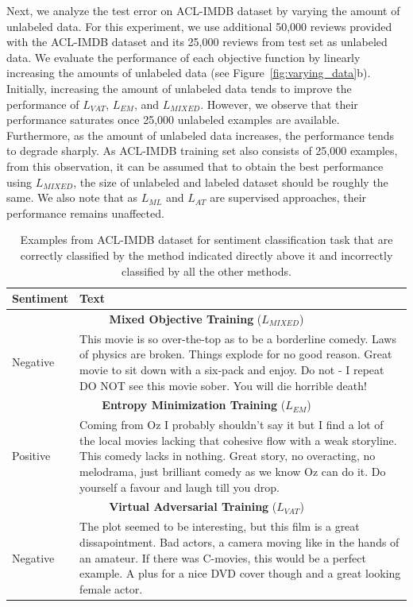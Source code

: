 \documentclass[letterpaper]{article}
\begin{document}
Next, we analyze the test error on ACL-IMDB dataset by varying the amount of unlabeled data. For this experiment, we use additional 50,000 reviews provided with the ACL-IMDB dataset and its 25,000 reviews from test set as unlabeled data. We evaluate the performance of each objective function by linearly increasing the amounts of unlabeled data (see Figure~\ref{fig:varying_data}b). Initially, increasing the amount of unlabeled data tends to improve the performance of $L_{\textit{VAT}}$, $L_{\textit{EM}}$, and $L_{\textit{MIXED}}$. However, we observe that their performance saturates once 25,000 unlabeled examples are available. Furthermore, as the amount of unlabeled data increases, the performance tends to degrade sharply. As ACL-IMDB training set also consists of 25,000 examples, from this observation, it can be assumed that to obtain the best performance using $L_{\textit{MIXED}}$, the size of unlabeled and labeled dataset should be roughly the same. We also note that as $L_{\textit{ML}}$ and $L_{\textit{AT}}$ are supervised approaches, their performance remains unaffected.

\begin{table}[t]
\begin{minipage}{\linewidth}
\small
\centering
\begin{tabularx}{\linewidth}{@{} l X @{}}
\toprule
\textbf{Sentiment} & \textbf{Text} \\
\midrule
\multicolumn{2}{c}{\textbf{Mixed Objective Training} ($L_{\textit{MIXED}}$)} \\
\midrule
Negative & This movie is so over-the-top as to be a borderline comedy. Laws of physics are broken. Things explode for no good reason. Great movie to sit down with a six-pack and enjoy. Do not - I repeat DO NOT see this movie sober. You will die horrible death!\\
\midrule
\multicolumn{2}{c}{\textbf{Entropy Minimization Training} ($L_{\textit{EM}}$)} \\
\midrule
Positive & Coming from Oz I probably shouldn't say it but I find a lot of the local movies lacking that cohesive flow with a weak storyline. This comedy lacks in nothing. Great story, no overacting, no melodrama, just brilliant comedy as we know Oz can do it. Do yourself a favour and laugh till you drop.\\
\midrule
\multicolumn{2}{c}{\textbf{Virtual Adversarial Training} ($L_{\textit{VAT}}$)} \\
\midrule
Negative & The plot seemed to be interesting, but this film is a great dissapointment. Bad actors, a camera moving like in the hands of an amateur. If there was C-movies, this would be a perfect example. A plus for a nice DVD cover though and a great looking female actor.\\
\bottomrule
\end{tabularx}
\caption{Examples from ACL-IMDB dataset for sentiment classification task that are correctly classified by the method indicated directly above it and incorrectly classified by all the other methods.}
\label{table:examples}
\end{minipage}
\end{table}
\end{document}

